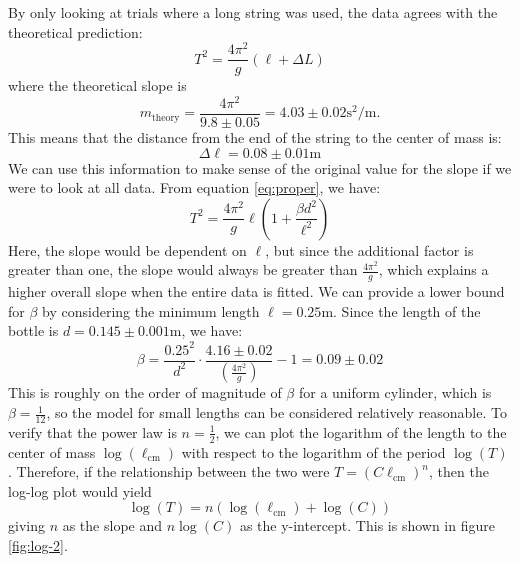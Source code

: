 \documentclass[%
 reprint,
 amsmath,amssymb
 aps,
]{revtex4-2}
\begin{document}
By only looking at trials where a long string was used, the data agrees with the theoretical prediction:
\begin{equation}
    T^2 = \frac{4\pi^2}{g}\left(\ell+\Delta L\right)
    \label{eq:}
\end{equation}
where the theoretical slope is
\begin{equation}
    m_\text{theory} = \frac{4\pi^2}{9.8\pm 0.05} = 4.03 \pm 0.02 \si{\second\squared\per\meter}.
    \label{eq:mtheory}
\end{equation}
This means that the distance from the end of the string to the center of mass is:
\begin{equation}
    \Delta \ell = 0.08 \pm 0.01\si{\meter} 
    \label{eq:}
\end{equation}
We can use this information to make sense of the original value for the slope if we were to look at all data. From equation \ref{eq:proper}, we have:
\begin{equation}
    T^2 = \frac{4\pi^2}{g}\ell \left(1+\frac{\beta d^2}{\ell^2}\right)
\end{equation}
Here, the slope would be dependent on $\ell$, but since the additional factor is greater than one, the slope would always be greater than $\frac{4\pi^2}{g}$, which explains a higher overall slope when the entire data is fitted. We can provide a lower bound for $\beta$ by considering the minimum length $\ell=0.25\si{\meter}$. Since the length of the bottle is $d=0.145 \pm 0.001 \si{\meter}$, we have:
\begin{equation}
    \beta = \frac{0.25^2}{d^2} \cdot \frac{4.16 \pm 0.02}{\left(\frac{4\pi^2}{g}\right)}-1 = 0.09 \pm 0.02
    \label{eq:}
\end{equation}
This is roughly on the order of magnitude of $\beta$ for a uniform cylinder, which is $\beta=\frac{1}{12}$, so the model for small lengths can be considered relatively reasonable. To verify that the power law is $n=\frac{1}{2}$, we can plot the logarithm of the length to the center of mass $\log(\ell_\text{cm})$ with respect to the logarithm of the period $\log(T)$. Therefore, if the relationship between the two were $T = (C\ell_\text{cm})^n$, then the log-log plot would yield
\begin{equation}
    \log(T) = n\left(\log(\ell_\text{cm}) + \log(C)\right)
    \label{eq:}
\end{equation}
giving $n$ as the slope and $n\log(C)$ as the y-intercept. This is shown in figure \ref{fig:log-2}.
\end{document}
